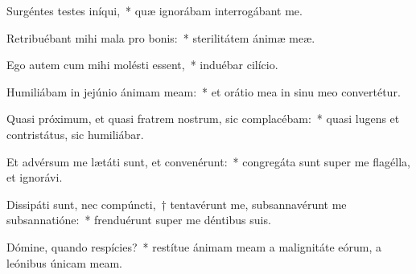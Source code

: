 
\item Surgéntes testes iníqui,~* quæ ignorábam interrogábant me.

\item Retribuébant mihi mala pro bonis:~* sterilitátem ánimæ meæ.

\item Ego autem cum mihi molésti essent,~* induébar cilício.

\item Humiliábam in jejúnio ánimam meam:~* et orátio mea in sinu meo convertétur.

\item Quasi próximum, et quasi fratrem nostrum, sic complacébam:~* quasi lugens et contristátus, sic humiliábar.

\item Et advérsum me lætáti sunt, et convenérunt:~* congregáta sunt super me flagélla, et ignorávi.

\item Dissipáti sunt, nec compúncti,~† tentavérunt me, subsannavérunt me subsannatióne:~* frenduérunt super me déntibus suis.

\item Dómine, quando respícies?~* restítue ánimam meam a malignitáte eórum, a leónibus únicam meam.
